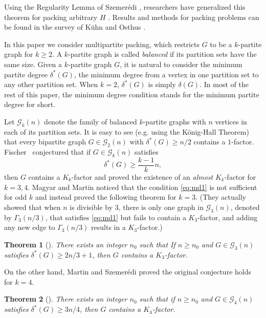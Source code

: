 \documentclass[reqno]{amsart}
\newtheorem{theorem}{Theorem}
\theoremstyle{plain}
\def\G{\mathcal{G}}
\begin{document}
Using the Regularity Lemma of Szemer\'edi \cite{Sz}, researchers have generalized this
theorem for packing arbitrary $H$ \cite{AlYu2, KSS-AY, AliYi, KuOs}.
Results and methods for packing problems can be found in the survey of K\"{u}hn and Osthus \cite{KuOs-survey}.

In this paper we consider multipartite packing, which restricts $G$ to be a $k$-partite graph for $k\ge 2$.
A $k$-partite graph is called \emph{balanced} if its partition sets have the same size.
Given a $k$-partite graph $G$, it is natural to consider the minimum partite degree ${\delta}^*(G)$, the minimum degree from a vertex in one partition set to any other partition set. When $k=2$, $\delta^*(G)$ is simply $\delta(G)$. In most of the rest of this paper, the minimum degree condition stands for the minimum partite degree for short.

Let $\G_k(n)$ denote the family of balanced $k$-partite graphs with $n$ vertices in each of its partition sets. It is easy to see (e.g. using the K\"{o}nig-Hall Theorem) that every bipartite graph $G\in \G_2(n)$ with $\delta^*(G)\ge n/2$ contains a $1$-factor. Fischer~\cite{Fischer} conjectured that if $G\in \G_k(n)$ satisfies
\begin{equation}
\label{eq:md1}
{\delta}^*(G)\ge \frac{k-1}{k} n,
\end{equation}
then $G$ contains a $K_k$-factor and proved the existence of an \emph{almost} $K_k$-factor for $k=3, 4$. Magyar and Martin \cite{MaMa} noticed that the condition \eqref{eq:md1} is not sufficient for odd $k$ and instead proved the following theorem for $k=3$. (They actually showed that when $n$ is divisible by $3$, there is only one graph in $\G_3(n)$, denoted by $\Gamma_3(n/3)$, that satisfies \eqref{eq:md1} but fails to contain a $K_3$-factor, and adding any new edge to $\Gamma_3(n/3)$ results in a $K_3$-factor.)

\begin{theorem}[\cite{MaMa}]
There exists an integer $n_0$ such that If $n\ge n_0$ and $G\in \G_3(n)$ satisfies ${\delta}^*(G)\ge 2n/3 +1$, then $G$ contains a $K_3$-factor. \label{thm:MM}
\end{theorem}

On the other hand, Martin and Szemer\'edi \cite{MaSz} proved the original conjecture holds for $k=4$.

\begin{theorem}[\cite{MaSz}]
There exists an integer $n_0$ such that if $n\ge n_0$ and $G\in \G_4 (n)$ satisfies ${\delta}^*(G)\ge 3n/4$,
then $G$ contains a $K_4$-factor. \label{thm:MS}
\end{theorem}
\end{document}
